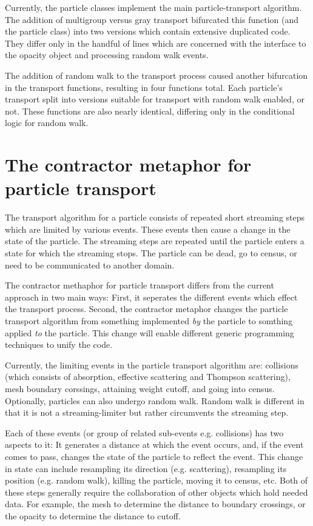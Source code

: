 \documentclass[memo]{ResearchNote}
\begin{document}
Currently, the particle classes implement the main particle-transport
algorithm.  The addition of multigroup versus gray transport
bifurcated this function (and the particle class) into two versions
which contain extensive duplicated code. They differ only in the
handful of lines which are concerned with the interface to the opacity
object and processing random walk events.

The addition of random walk to the transport process caused another
bifurcation in the transport functions, resulting in four functions
total. Each particle's transport split into versions suitable for
transport with random walk enabled, or not. These functions are also
nearly identical, differing only in the conditional logic for random
walk.

\section{The contractor metaphor for particle transport}

The transport algorithm for a particle consists of repeated short
streaming steps which are limited by various events. These events then
cause a change in the state of the particle. The streaming steps are
repeated until the particle enters a state for which the streaming
stops. The particle can be dead, go to census, or need to be
communicated to another domain.

The contractor methaphor for particle transport differs from the
current approach in two main ways: First, it seperates the different
events which effect the transport process. Second, the contractor
metaphor changes the particle transport algorithm from something
implemented {\em by} the particle to somthing applied {\em to} the
particle. This change will enable different generic programming
techniques to unify the code.

Currently, the limiting events in the particle transport algorithm
are: collisions (which consists of absorption, effective scattering
and Thompson scattering), mesh boundary corssings, attaining weight
cutoff, and going into census. Optionally, particles can also undergo
random walk. Random walk is different in that it is not a
streaming-limiter but rather circumvents the streaming step.

Each of these events (or group of related sub-events e.g. collisions)
has two aspects to it: It generates a distance at which the event
occurs, and, if the event comes to pass, changes the state of the
particle to reflect the event. This change in state can include
resampling its direction (e.g. scattering), resampling its position
(e.g. random walk), killing the particle, moving it to census, etc.
Both of these steps generally require the collaboration of other
objects which hold needed data. For example, the mesh to determine the
distance to boundary crossings, or the opacity to determine the
distance to cutoff.
\end{document}
